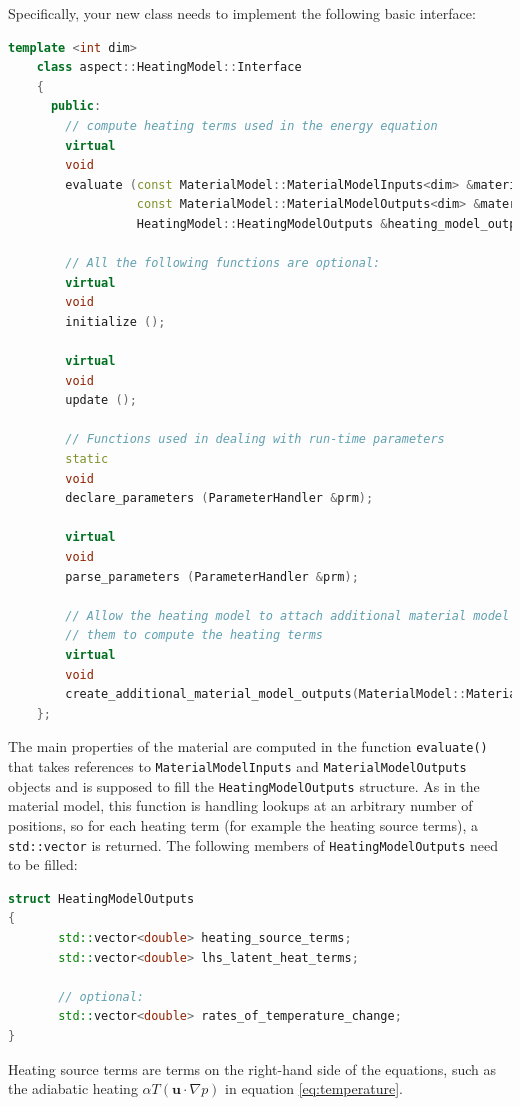 \documentclass{article}
\begin{document}
Specifically, your new class needs to implement the following basic interface:
\begin{lstlisting}[frame=single,language=C++]
    template <int dim>
    class aspect::HeatingModel::Interface
    {
      public:
        // compute heating terms used in the energy equation
        virtual
        void
        evaluate (const MaterialModel::MaterialModelInputs<dim> &material_model_inputs,
                  const MaterialModel::MaterialModelOutputs<dim> &material_model_outputs,
                  HeatingModel::HeatingModelOutputs &heating_model_outputs) const;

        // All the following functions are optional:
        virtual
        void
        initialize ();

        virtual
        void
        update ();

        // Functions used in dealing with run-time parameters
        static
        void
        declare_parameters (ParameterHandler &prm);

        virtual
        void
        parse_parameters (ParameterHandler &prm);

        // Allow the heating model to attach additional material model outputs in case it needs
        // them to compute the heating terms
        virtual
        void
        create_additional_material_model_outputs(MaterialModel::MaterialModelOutputs<dim> &) const;
    };
\end{lstlisting}
The main properties of the material are computed in the function
\texttt{evaluate()} that takes references to
\texttt{MaterialModelInputs} and \texttt{MaterialModelOutputs} objects
and is supposed to fill the
\texttt{HeatingModelOutputs} structure. As in the material model, this function is handling lookups at an
arbitrary number of positions, so for each heating term (for example the heating source terms), a \texttt{std::vector}
is returned. The following members of \texttt{HeatingModelOutputs} need to be filled:
\begin{lstlisting}[frame=single,language=C++]
struct HeatingModelOutputs
{
       std::vector<double> heating_source_terms;
       std::vector<double> lhs_latent_heat_terms;

       // optional:
       std::vector<double> rates_of_temperature_change;
}
\end{lstlisting}
Heating source terms are terms on the right-hand side of the equations, such as the adiabatic heating
$\alpha T \left( \mathbf u \cdot \nabla p \right)$ in equation \eqref{eq:temperature}.
\end{document}

